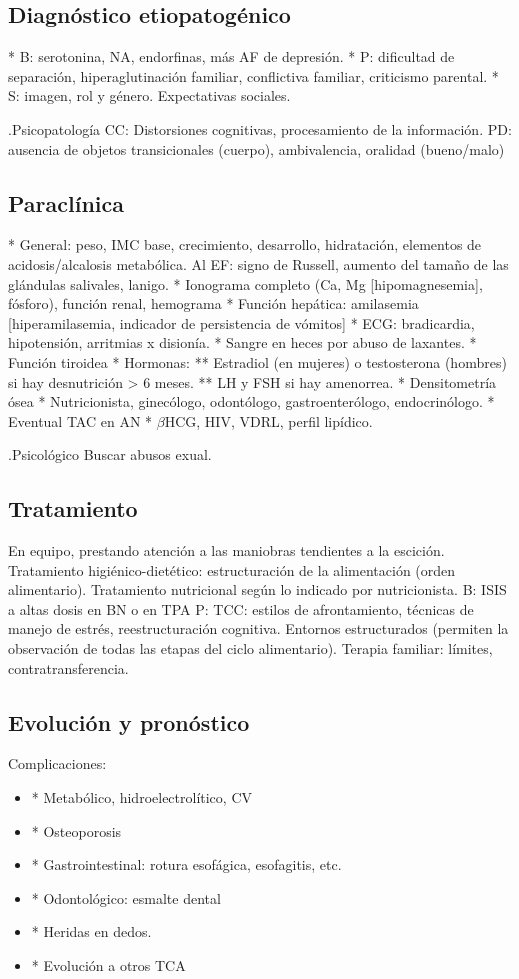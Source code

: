 \subsection*{Diagnóstico etiopatogénico}
* B: serotonina, NA, endorfinas, más AF de depresión.
* P: dificultad de separación, hiperaglutinación familiar, conflictiva familiar, criticismo parental.
* S: imagen, rol y género. Expectativas sociales.

.Psicopatología
CC: Distorsiones cognitivas, procesamiento de la información.
PD: ausencia de objetos transicionales (cuerpo), ambivalencia, oralidad (bueno/malo)

\subsection*{Paraclínica}
* General: peso, IMC base, crecimiento, desarrollo, hidratación, elementos de acidosis/alcalosis metabólica. Al EF: signo de Russell, aumento del tamaño de las glándulas salivales, lanigo.
* Ionograma completo (Ca, Mg [hipomagnesemia], fósforo), función renal, hemograma
* Función hepática: amilasemia [hiperamilasemia, indicador de persistencia de vómitos]
* ECG: bradicardia, hipotensión, arritmias x disionía.
* Sangre en heces por abuso de laxantes.
* Función tiroidea
* Hormonas:
** Estradiol (en mujeres) o testosterona (hombres) si hay desnutrición > 6 meses.
** LH y FSH si hay amenorrea.
* Densitometría ósea
* Nutricionista, ginecólogo, odontólogo, gastroenterólogo, endocrinólogo.
* Eventual TAC en AN
* $\beta$HCG, HIV, VDRL, perfil lipídico.

.Psicológico
Buscar abusos exual.

\subsection*{Tratamiento}
En equipo, prestando atención a las maniobras tendientes a la escición.
Tratamiento higiénico-dietético: estructuración de la alimentación (orden alimentario).
Tratamiento nutricional según lo indicado por nutricionista.
B: ISIS a altas dosis en BN o en TPA
P: TCC: estilos de afrontamiento, técnicas de manejo de estrés, reestructuración cognitiva. Entornos estructurados (permiten la observación de todas las etapas del ciclo alimentario). Terapia familiar: límites, contratransferencia.

\subsection*{Evolución y pronóstico}
Complicaciones:
\begin{itemize}
	\item * Metabólico, hidroelectrolítico, CV
	\item * Osteoporosis
	\item * Gastrointestinal: rotura esofágica, esofagitis, etc.
	\item * Odontológico: esmalte dental
	\item * Heridas en dedos.
	\item * Evolución a otros TCA
\end{itemize}
\printbibliography

